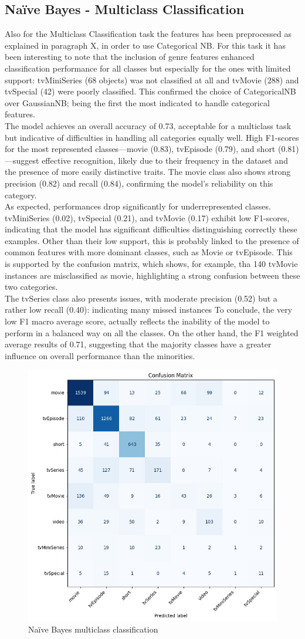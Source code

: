 \subsection{Naïve Bayes - Multiclass Classification}    
Also for the Multiclass Classification task the features has been preprocessed as explained in paragraph X, 
in order to use Categorical NB. For this task it has been interesting to note that the inclusion of genre features enhanced classification performance 
for all classes but especially for the ones with limited support: tvMiniSeries (68 objects) was not classified at all and tvMovie (288) and tvSpecial (42) 
were poorly classified. This confirmed the choice of CategoricalNB over GaussianNB; being the first the most indicated to handle categorical features.\\
The model achieves an overall accuracy of 0.73, acceptable for a multiclass task but indicative of difficulties in handling all categories equally well. 
High F1-scores for the most represented classes—movie (0.83), tvEpisode (0.79), and short (0.81)—suggest effective recognition, likely due to their frequency in the dataset and the presence of more easily distinctive traits. The movie class also shows strong precision (0.82) and recall (0.84), 
confirming the model's reliability on this category.\\
As expected, performances drop significantly for underrepresented classes. tvMiniSeries (0.02), tvSpecial (0.21), and tvMovie (0.17) exhibit low F1-scores, indicating that the model has significant difficulties distinguishing correctly these examples. 
Other than their low support, this is probably linked to the presence of common features with more dominant classes, such as Movie or tvEpisode. This is supported by the confusion matrix, which shows, for example, tha 140 tvMovie instances are  misclassified as movie, highlighting a strong confusion between these two categories.\\
The tvSeries class also presents issues, with moderate precision (0.52) but a rather low recall (0.40): indicating many missed instances
To conclude, the very low F1 macro average score, actually reflects the inability of the model to perform in a balanced way on all the classes. 
On the other hand, the F1 weighted average results of 0.71, suggesting that the majority classes have a greater influence on overall performance than the minorities.
\begin{figure}[H]
    \centering
    \includegraphics[width=0.30\linewidth]{plots/nb_multiclass_confmatrix.jpg}
    \captionsetup{justification=centering, width=0.9\linewidth}
    \caption{Naïve Bayes multiclass classification}
    \label{fig:nb_multiclass}
\end{figure}



